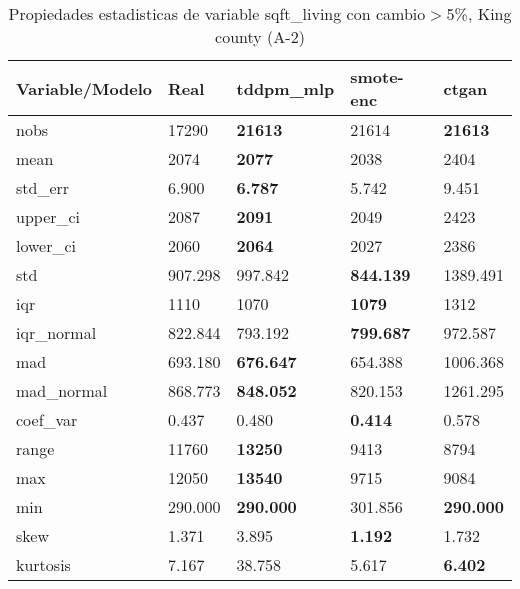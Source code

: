 \begin{table}[H]
\centering
\fontsize{8}{14}\selectfont
\caption{Propiedades estadisticas de variable sqft\_living con cambio\ensuremath{>}5\%, King county (A-2)}
\label{table-stats-king county-a-2-sqft_living-short}
\begin{tabular}{|l|m{10em}|m{10em}|m{10em}|m{10em}|}
\hline
 \rowcolor[gray]{0.8}
Variable/Modelo & Real & tddpm\_mlp & smote-enc & ctgan \\
\hline nobs & 17290 & \bfseries 21613 & \cellcolor[rgb]{0.9, 0.54, 0.52} 21614 & \bfseries 21613 \\
\hline mean & 2074 & \bfseries 2077 & 2038 & \cellcolor[rgb]{0.9, 0.54, 0.52} 2404 \\
\hline std\_err & 6.900 & \bfseries 6.787 & 5.742 & \cellcolor[rgb]{0.9, 0.54, 0.52} 9.451 \\
\hline upper\_ci & 2087 & \bfseries 2091 & 2049 & \cellcolor[rgb]{0.9, 0.54, 0.52} 2423 \\
\hline lower\_ci & 2060 & \bfseries 2064 & 2027 & \cellcolor[rgb]{0.9, 0.54, 0.52} 2386 \\
\hline std & 907.298 & 997.842 & \bfseries 844.139 & \cellcolor[rgb]{0.9, 0.54, 0.52} 1389.491 \\
\hline iqr & 1110 & 1070 & \bfseries 1079 & \cellcolor[rgb]{0.9, 0.54, 0.52} 1312 \\
\hline iqr\_normal & 822.844 & 793.192 & \bfseries 799.687 & \cellcolor[rgb]{0.9, 0.54, 0.52} 972.587 \\
\hline mad & 693.180 & \bfseries 676.647 & 654.388 & \cellcolor[rgb]{0.9, 0.54, 0.52} 1006.368 \\
\hline mad\_normal & 868.773 & \bfseries 848.052 & 820.153 & \cellcolor[rgb]{0.9, 0.54, 0.52} 1261.295 \\
\hline coef\_var & 0.437 & 0.480 & \bfseries 0.414 & \cellcolor[rgb]{0.9, 0.54, 0.52} 0.578 \\
\hline range & 11760 & \bfseries 13250 & 9413 & \cellcolor[rgb]{0.9, 0.54, 0.52} 8794 \\
\hline max & 12050 & \bfseries 13540 & 9715 & \cellcolor[rgb]{0.9, 0.54, 0.52} 9084 \\
\hline min & 290.000 & \bfseries 290.000 & \cellcolor[rgb]{0.9, 0.54, 0.52} 301.856 & \bfseries 290.000 \\
\hline skew & 1.371 & \cellcolor[rgb]{0.9, 0.54, 0.52} 3.895 & \bfseries 1.192 & 1.732 \\
\hline kurtosis & 7.167 & \cellcolor[rgb]{0.9, 0.54, 0.52} 38.758 & 5.617 & \bfseries 6.402 \\

\end{tabular}
\end{table}
